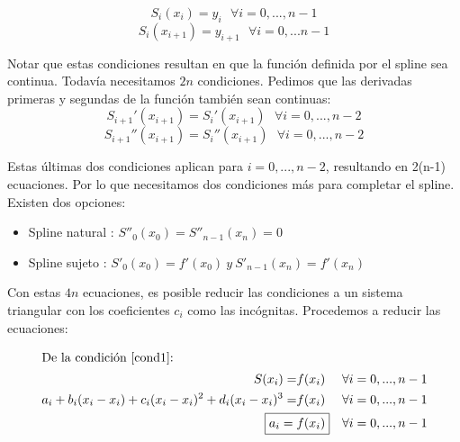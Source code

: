 \begin{equation}\label{cond1}
S_i(x_i) = y_i  \ \ \ \forall i=0, ..., n-1 \tag{cond1}
\end{equation}
\begin{equation}\label{cond2}
S_i(x_{i+1}) = y_{i+1} \ \ \ \forall i=0,... n-1 \tag{cond2}
\end{equation}
\par Notar que estas condiciones resultan en que la función definida por el spline sea continua. Todavía necesitamos $2n$ condiciones. Pedimos que las derivadas primeras y segundas de la función también sean continuas:
\begin{equation}\label{cond3}
S_{i+1}'(x_{i+1}) = S_{i}'(x_{i+1}) \ \ \  \forall  i=0, ..., n-2 \tag{cond3}
\end{equation}
\begin{equation}\label{cond4}
S_{i+1}''(x_{i+1}) = S_{i}''(x_{i+1}) \ \ \  \forall i=0, ..., n-2 \tag{cond4}
\end{equation}
\par Estas últimas dos condiciones aplican para $i=0, ..., n-2$, resultando en 2(n-1) ecuaciones. Por lo que necesitamos dos condiciones más para completar el spline. Existen dos opciones:

\begin{itemize}
\item Spline natural : $S''_0(x_0) =  S''_{n-1}(x_n) = 0$
\item Spline sujeto : $S'_0(x_0) = f'(x_0)\ y\ S'_{n-1}(x_n) = f'(x_n) $
\end{itemize}

\par Con estas $4n$ ecuaciones, es posible reducir las condiciones a un sistema triangular con los coeficientes $c_i$ como las incógnitas. Procedemos a reducir las ecuaciones:




\setlength{\belowdisplayskip}{0pt} \setlength{\belowdisplayshortskip}{0pt}
\setlength{\abovedisplayskip}{0pt} \setlength{\abovedisplayshortskip}{0pt}

\begin{align*}
\intertext{De la condición \eqref{cond1}: } 
S(x_i) = & f(x_i)				& \forall i=0, ..., n-1 \\
a_i + b_i(x_i-x_i) + c_i(x_i-x_i)^2 + d_i(x_i-x_i)^3  = & f(x_i) 	& \forall i=0, ..., n-1 \\
\Aboxed{a_i = & f(x_i)} 	& \forall i=0, ..., n-1 \\
\end{align*}


